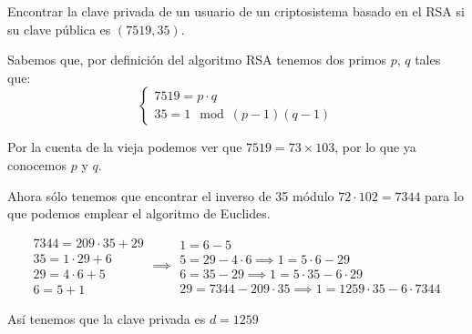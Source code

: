 \begin{problem}[2]
Encontrar la clave privada de un usuario  de un criptosistema basado en el RSA si su clave p\'ublica   es  $(7519, 35)$.

\solution


Sabemos que, por definición del algoritmo RSA tenemos dos primos $p$, $q$ tales que:
\[\left\{ \begin{array}{l} 7519 = p \cdot q\\
35 = 1 \mod (p-1)(q-1)\end{array}\right.\]

Por la cuenta de la vieja podemos ver que $7519=73 \times 103$, por lo que ya conocemos $p$ y $q$.

Ahora sólo tenemos que encontrar el inverso de 35 módulo $72 \cdot 102 = 7344$ para lo que podemos emplear el algoritmo de Euclides.

\[
\begin{array}{l}
7344 = 209\cdot 35 +29\\
35 = 1 \cdot 29 + 6 \\
29 = 4\cdot 6 + 5 \\
6 = 5 + 1
\end{array} \implies \begin{array}{l}
1 = 6 - 5 \\
5 = 29 - 4 \cdot 6 \implies 1 = 5 \cdot 6-29\\
6 = 35 - 29 \implies 1 = 5\cdot 35 -6 \cdot 29 \\
29 = 7344 - 209 \cdot 35 \implies 1=1259 \cdot 35 -6\cdot 7344
\end{array}
\]

Así tenemos que la clave privada es $d=1259$

\end{problem}

